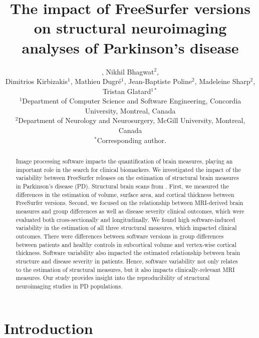 \documentclass[11pt]{article}
\title{The impact of FreeSurfer versions on structural neuroimaging analyses of Parkinson's disease}
\author{\rev{Yohan Chatelain$^{1\dagger}$, Andrzej Sokołowski$^{1\dagger}$, Vinuyan Sivakolunthu$^{1}$},
Nikhil Bhagwat$^{2}$,\\
Dimitrios Kirbizakis$^{1}$, Mathieu Dugré$^{1}$, Jean-Baptiste Poline$^{2}$, Madeleine Sharp$^{2}$,\\
Tristan Glatard$^{1*}$\\[1ex]
\small $^{1}$Department of Computer Science and Software Engineering, Concordia University, Montreal, Canada\\
\small $^{2}$Department of Neurology and Neurosurgery, McGill University, Montreal, Canada\\[1ex]
\small \rev{$^{\dagger}$These authors contributed equally to this work.} $^{*}$Corresponding author.}
\date{}
\begin{document}
\onehalfspacing
\maketitle

\begin{abstract}
Image processing software impacts the quantification of brain measures, playing an important role in the search
for clinical biomarkers. We investigated the impact of the variability between FreeSurfer releases on the
estimation of structural brain measures in Parkinson's disease (PD). Structural brain scans from
. First, we measured the differences in the estimation of
volume, surface area, and cortical thickness between FreeSurfer versions. Second, we focused on the relationship
between MRI-derived brain measures and group differences as well as disease severity clinical outcomes, which
were evaluated both cross-sectionally and longitudinally. We found high software-induced variability in the
estimation of all three structural measures, which impacted clinical outcomes. There were differences between
software versions in group differences between patients and healthy controls in subcortical volume and
vertex-wise cortical thickness. Software variability also impacted the estimated relationship between brain
structure and disease severity in patients.  Hence, software variability not only relates to the estimation of
structural measures, but it also impacts clinically-relevant MRI measures. Our study provides insight into the
reproducibility of structural neuroimaging studies in PD populations.
\end{abstract}

\section{Introduction}
\end{document}
